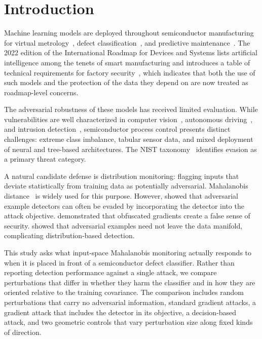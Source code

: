 \documentclass[preprint,12pt,authoryear]{elsarticle}
\begin{document}
\section{Introduction}
\label{sec:intro}
Machine learning models are deployed throughout semiconductor manufacturing for virtual metrology~\citep{maitra2024,dreyfus2022}, defect classification~\citep{lee2017fdc}, and predictive maintenance~\citep{susto2015pdm}. The 2022 edition of the International Roadmap for Devices and Systems lists artificial intelligence among the tenets of smart manufacturing and introduces a table of technical requirements for factory security~\citep{irds2022}, which indicates that both the use of such models and the protection of the data they depend on are now treated as roadmap-level concerns.

The adversarial robustness of these models has received limited evaluation. While vulnerabilities are well characterized in computer vision~\citep{szegedy2014,goodfellow2015}, autonomous driving~\citep{eykholt2018}, and intrusion detection~\citep{heydari2025,zhang2022nids}, semiconductor process control presents distinct challenges: extreme class imbalance, tabular sensor data, and mixed deployment of neural and tree-based architectures. The NIST taxonomy~\citep{vassilev2025nist} identifies evasion as a primary threat category.

A natural candidate defense is distribution monitoring: flagging inputs that deviate statistically from training data as potentially adversarial. Mahalanobis distance~\citep{lee2018mahal} is widely used for this purpose. However, \citet{carlini2017detect} showed that adversarial example detectors can often be evaded by incorporating the detector into the attack objective. \citet{athalye2018} demonstrated that obfuscated gradients create a false sense of security. \citet{stutz2019} showed that adversarial examples need not leave the data manifold, complicating distribution-based detection.

This study asks what input-space Mahalanobis monitoring actually responds to when it is placed in front of a semiconductor defect classifier. Rather than reporting detection performance against a single attack, we compare perturbations that differ in whether they harm the classifier and in how they are oriented relative to the training covariance. The comparison includes random perturbations that carry no adversarial information, standard gradient attacks, a gradient attack that includes the detector in its objective, a decision-based attack, and two geometric controls that vary perturbation size along fixed kinds of direction.
\end{document}
